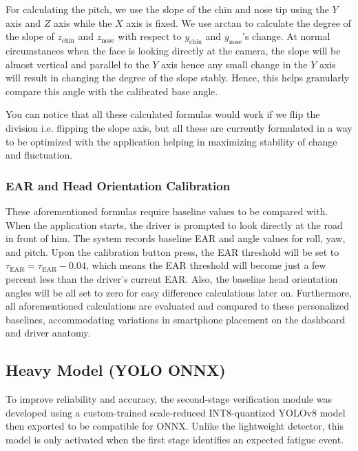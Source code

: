 \documentclass[pdflatex,sn-mathphys-num]{sn-jnl}
\theoremstyle{thmstyleone}%
\theoremstyle{thmstyletwo}%
\theoremstyle{thmstylethree}%
\begin{document}
	For calculating the pitch, we use the slope of the chin and nose tip using the $Y$ axis and $Z$ axis while the $X$ axis is fixed. We use arctan to calculate the degree of the slope of $z_{\mathrm{chin}}$ and $z_{\mathrm{nose}}$ with respect to $y_{\mathrm{chin}}$ and $y_{\mathrm{nose}}$'s change. At normal circumstances when the face is looking directly at the camera, the slope will be almost vertical and parallel to the $Y$ axis hence any small change in the $Y$ axis will result in changing the degree of the slope stably. Hence, this helps granularly compare this angle with the calibrated base angle. 
	
	\bigskip
	
	You can notice that all these calculated formulas would work if we flip the division i.e. flipping the slope axis, but all these are currently formulated in a way to be optimized with the application helping in maximizing stability of change and fluctuation.
	
	\subsubsection{EAR and Head Orientation Calibration}\label{sec:calib}
	These aforementioned formulas require baseline values to be compared with. When the application starts, the driver is prompted to look directly at the road in front of him. The system records baseline EAR and angle values for roll, yaw, and pitch. Upon the calibration button press, the EAR threshold will be set to $\tau_{\mathrm{EAR}} = \tau_{\mathrm{EAR}} - 0.04$, which means the EAR threshold will become just a few percent less than the driver's current EAR. Also, the baseline head orientation angles will be all set to zero for easy difference calculations later on. Furthermore, all aforementioned calculations are evaluated and compared to these personalized baselines, accommodating variations in smartphone placement on the dashboard and driver anatomy.
	
	\subsection{Heavy Model (YOLO ONNX)}\label{sec:heavy}
	
	To improve reliability and accuracy, the second-stage verification module was developed using a custom-trained scale-reduced INT8-quantized YOLOv8 model then exported to be compatible for ONNX. Unlike the lightweight detector, this model is only activated when the first stage identifies an expected fatigue event. 
	
\end{document}
